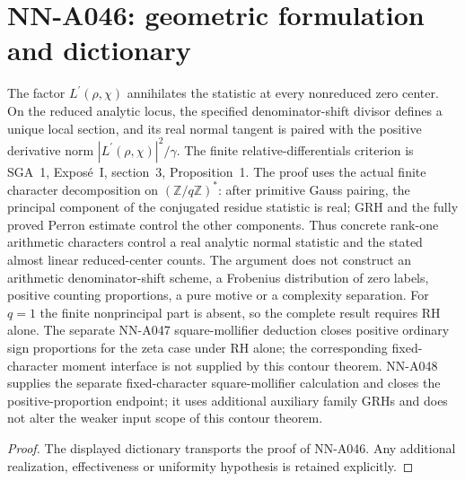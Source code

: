 \section{NN-A046: geometric formulation and dictionary}
\begin{geometricstatement}[NN-A046]
The factor $L^\prime(\rho,\chi)$ annihilates the statistic at every nonreduced zero center. On the reduced analytic locus, the specified denominator-shift divisor defines a unique local section, and its real normal tangent is paired with the positive derivative norm $|L^\prime(\rho,\chi)|^2/\gamma$. The finite relative-differentials criterion is SGA~1, Expos\'e~I, section~3, Proposition~1. The proof uses the actual finite character decomposition on $(\mathbb Z/q\mathbb Z)^*$: after primitive Gauss pairing, the principal component of the conjugated residue statistic is real; GRH and the fully proved Perron estimate control the other components. Thus concrete rank-one arithmetic characters control a real analytic normal statistic and the stated almost linear reduced-center counts. The argument does not construct an arithmetic denominator-shift scheme, a Frobenius distribution of zero labels, positive counting proportions, a pure motive or a complexity separation. For $q=1$ the finite nonprincipal part is absent, so the complete result requires RH alone. The separate NN-A047 square-mollifier deduction closes positive ordinary sign proportions for the zeta case under RH alone; the corresponding fixed-character moment interface is not supplied by this contour theorem. NN-A048 supplies the separate fixed-character square-mollifier calculation and closes the positive-proportion endpoint; it uses additional auxiliary family GRHs and does not alter the weaker input scope of this contour theorem.
\end{geometricstatement}
\begin{proof} The displayed dictionary transports the proof of NN-A046. Any additional realization, effectiveness or uniformity hypothesis is retained explicitly.\end{proof}


